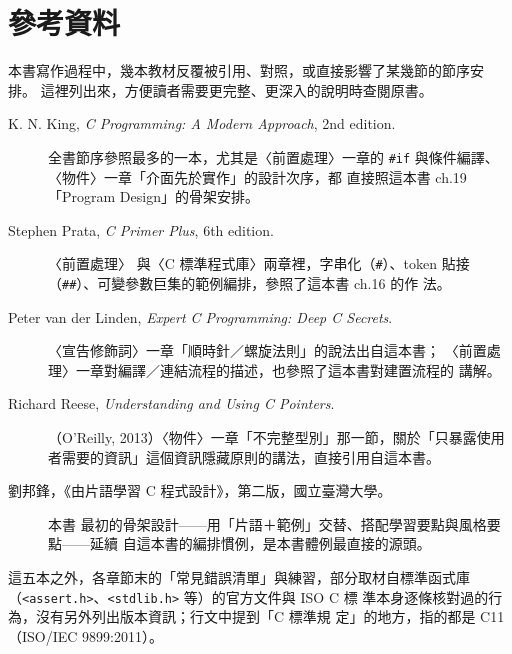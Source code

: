 {}
\chapter*{參考資料}
\label{ch:references}

本書寫作過程中，幾本教材反覆被引用、對照，或直接影響了某幾節的節序安
排。 這裡列出來，方便讀者需要更完整、更深入的說明時查閱原書。

\begin{description}
\item[K. N. King, \textit{C Programming: A Modern Approach}, 2nd
edition.] 全書節序參照最多的一本，尤其是〈前置處理〉一章的
\texttt{\#if} 與條件編譯、〈物件〉一章「介面先於實作」的設計次序，都
直接照這本書 ch.19「Program Design」的骨架安排。

\item[Stephen Prata, \textit{C Primer Plus}, 6th edition.] 〈前置處理〉
與〈C 標準程式庫〉兩章裡，字串化（\texttt{\#}）、token 貼接
（\texttt{\#\#}）、可變參數巨集的範例編排，參照了這本書 ch.16 的作
法。

\item[Peter van der Linden, \textit{Expert C Programming: Deep C
Secrets}.] 〈宣告修飾詞〉一章「順時針／螺旋法則」的說法出自這本書；
〈前置處理〉一章對編譯／連結流程的描述，也參照了這本書對建置流程的
講解。

\item[Richard Reese, \textit{Understanding and Using C Pointers}.]
（O'Reilly, 2013）〈物件〉一章「不完整型別」那一節，關於「只暴露使用
者需要的資訊」這個資訊隱藏原則的講法，直接引用自這本書。

\item[劉邦鋒，《由片語學習 C 程式設計》，第二版，國立臺灣大學。] 本書
最初的骨架設計——用「片語＋範例」交替、搭配學習要點與風格要點——延續
自這本書的編排慣例，是本書體例最直接的源頭。
\end{description}

這五本之外，各章節末的「常見錯誤清單」與練習，部分取材自標準函式庫
（\texttt{<assert.h>}、\texttt{<stdlib.h>} 等）的官方文件與 ISO C 標
準本身逐條核對過的行為，沒有另外列出版本資訊；行文中提到「C 標準規
定」的地方，指的都是 C11（ISO/IEC 9899:2011）。
